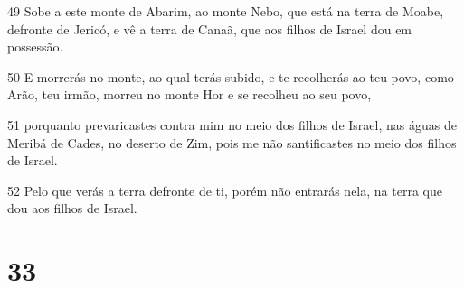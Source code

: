 \par 49 Sobe a este monte de Abarim, ao monte Nebo, que está na terra de Moabe, defronte de Jericó, e vê a terra de Canaã, que aos filhos de Israel dou em possessão.
\par 50 E morrerás no monte, ao qual terás subido, e te recolherás ao teu povo, como Arão, teu irmão, morreu no monte Hor e se recolheu ao seu povo,
\par 51 porquanto prevaricastes contra mim no meio dos filhos de Israel, nas águas de Meribá de Cades, no deserto de Zim, pois me não santificastes no meio dos filhos de Israel.
\par 52 Pelo que verás a terra defronte de ti, porém não entrarás nela, na terra que dou aos filhos de Israel.

\chapter{33}


